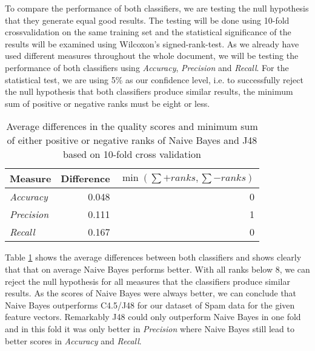 To compare the performance of both classifiers, we are testing the null hypothesis that they generate equal good results.
The testing will be done using 10-fold crossvalidation on the same training set and the statistical significance of the results will be examined using Wilcoxon's signed-rank-test.
As we already have used different measures throughout the whole document, we will be testing the performance of both classifiers using \emph{Accuracy}, \emph{Precision} and \emph{Recall}.
For the statistical test, we are using 5\% as our confidence level, i.e. to successfully reject the null hypothesis that both classifiers produce similar results, the minimum sum of positive or negative ranks must be eight or less.

\begin{table}[h!]
    \centering
    \begin{tabular}{ | l | r | r | }
        \hline
        \textbf{Measure} & \textbf{Difference} & $\min(\sum +ranks, \sum -ranks)$ \\
        \hline
        \emph{Accuracy} & 0.048 & 0 \\
        \hline
        \emph{Precision} & 0.111 & 1 \\
        \hline
        \emph{Recall} & 0.167 & 0 \\
        \hline
    \end{tabular}
    \caption{Average differences in the quality scores and minimum sum of either positive or negative ranks of Naive Bayes and J48 based on 10-fold cross validation}
    \label{table:difference}
\end{table}

Table \ref{table:difference} shows the average differences between both classifiers and shows clearly that that on average Naive Bayes performs better.
With all ranks below $8$, we can reject the null hypothesis for all measures that the classifiers produce similar results.
As the scores of Naive Bayes were always better, we can conclude that Naive Bayes outperforms C4.5/J48 for our dataset of Spam data for the given feature vectors.
Remarkably J48 could only outperform Naive Bayes in one fold and in this fold it was only better in \emph{Precision} where Naive Bayes still lead to better scores in \emph{Accuracy} and \emph{Recall}.


